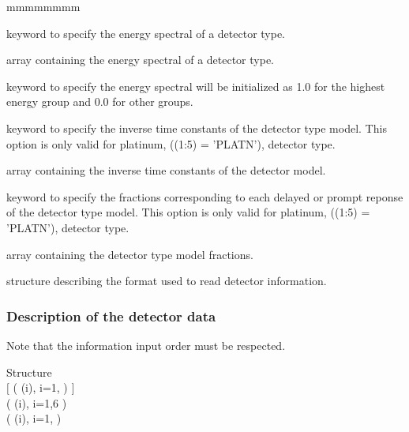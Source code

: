 \begin{ListeDeDescription}{mmmmmmmm}
\item[\moc{SPECTRAL}] keyword to specify the energy spectral of
a detector type.

\item[\dusa{spec}] array containing the energy spectral of a detector type.

\item[\moc{DEFAULT}] keyword to specify the energy spectral will be
initialized as 1.0 for the highest energy group and 0.0 for other groups.

\item[\moc{INVCONST}] keyword to specify the inverse time constants of
the detector type model. This option is only valid for platinum, 
((1:5) = 'PLATN'),
detector type. 
\item[\dusa{tinv}] array containing the inverse time constants of
the detector model.

\item[\moc{FRACTION}] keyword to specify the fractions corresponding to
each delayed or prompt reponse of the detector type model. This option is 
only valid for platinum, ((1:5) = 'PLATN'), detector type. 

\item[\dusa{frac}] array containing the detector type model fractions.

\item[\dstr{descdet}] structure describing the format used to read
detector information.
 
\end{ListeDeDescription}

\vskip 0.2cm

\subsubsection{Description of the detector data}

Note that the information input order must be respected. 

\begin{DataStructure}{Structure }
  \\
$[$    ( (i), i=1, ) $]$ \\
 ( (i), i=1,6 )\\
 ( (i), i=1, )\\
\end{DataStructure}

